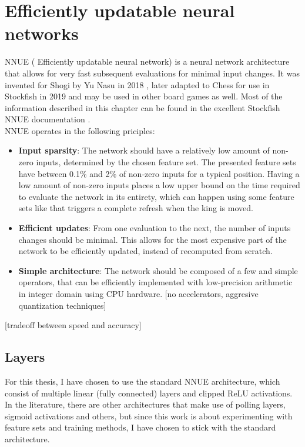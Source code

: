 \section{Efficiently updatable neural networks}

NNUE ( Efficiently updatable neural network) is a neural network architecture that allows for very fast subsequent evaluations for minimal input changes. It was invented for Shogi by Yu Nasu in 2018 \cite{nnue:2018}, later adapted to Chess for use in Stockfish in 2019 and may be used in other board games as well. Most of the information described in this chapter can be found in the excellent Stockfish NNUE documentation \cite{nnue-pytorch}. \\

NNUE operates in the following priciples:

\begin{itemize}
    \item \textbf{Input sparsity}: The network should have a relatively low amount of non-zero inputs, determined by the chosen feature set. The presented feature sets have between 0.1\% and 2\% of non-zero inputs for a typical position. Having a low amount of non-zero inputs places a low upper bound on the time required to evaluate the network in its entirety, which can happen using some feature sets like  that triggers a complete refresh when the king is moved.
    \item \textbf{Efficient updates}: From one evaluation to the next, the number of inputs changes should be minimal. This allows for the most expensive part of the network to be efficiently updated, instead of recomputed from scratch.
    \item \textbf{Simple architecture}: The network should be composed of a few and simple operators, that can be efficiently implemented with low-precision arithmetic in integer domain using CPU hardware. [no accelerators, aggresive quantization techniques]
\end{itemize}

[tradeoff between speed and accuracy]

\subsection{Layers}

For this thesis, I have chosen to use the standard NNUE architecture, which consist of multiple linear (fully connected) layers and clipped ReLU activations. In the literature, there are other architectures that make use of polling layers, sigmoid activations and others, but since this work is about experimenting with feature sets and training methods, I have chosen to stick with the standard architecture.

